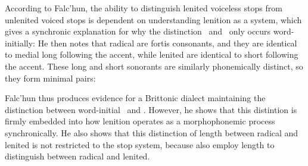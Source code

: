 According to Falc'hun, the ability to distinguish lenited voiceless stops from unlenited voiced stops is dependent on understanding lenition as a system, which gives a synchronic explanation for why the distinction \lT\ and \xD\ only occurs word-initially:
He then notes that radical  are fortis consonants, and they are identical to medial long  following the accent, while lenited  are identical to short  following the accent. These long and short sonorants are similarly phonemically distinct, so they form minimal pairs:
\begin{mwl}
\end{mwl}
Falc'hun thus produces evidence for a Brittonic dialect maintaining the distinction between word-initial \lT\ and \xD. However, he shows that this distintion is firmly embedded into how lenition operates as a morphophonemic process synchronically. He also shows that this distinction of length between radical and lenited is not restricted to the stop system, because  also employ length to distinguish between radical and lenited.



